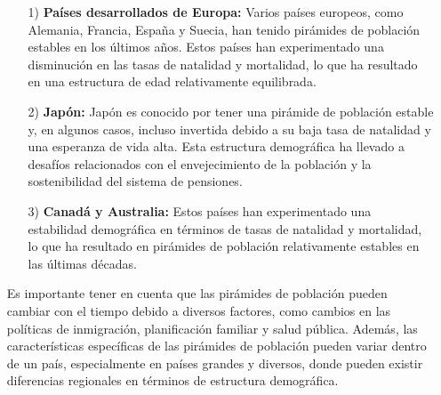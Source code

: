 \documentclass[8pt,a4paper]{beamer}
\begin{document}
{\begin{frame}{}
\begin{block}{}
\justifying
\begin{enumerate}
\justifying
\item[{}]
\begin{enumerate}
\justifying
\item[1)] \textbf{Países desarrollados de Europa:} Varios países europeos, como Alemania, Francia, España y Suecia, han tenido pirámides de población estables en los últimos años. Estos países han experimentado una disminución en las tasas de natalidad y mortalidad, lo que ha resultado en una estructura de edad relativamente equilibrada.

\item[2)] \textbf{Japón:} Japón es conocido por tener una pirámide de población estable y, en algunos casos, incluso invertida debido a su baja tasa de natalidad y una esperanza de vida alta. Esta estructura demográfica ha llevado a desafíos relacionados con el envejecimiento de la población y la sostenibilidad del sistema de pensiones.

\item[3)] \textbf{Canadá y Australia:} Estos países han experimentado una estabilidad demográfica en términos de tasas de natalidad y mortalidad, lo que ha resultado en pirámides de población relativamente estables en las últimas décadas.
\end{enumerate}
Es importante tener en cuenta que las pirámides de población pueden cambiar con el tiempo debido a diversos factores, como cambios en las políticas de inmigración, planificación familiar y salud pública. Además, las características específicas de las pirámides de población pueden variar dentro de un país, especialmente en países grandes y diversos, donde pueden existir diferencias regionales en términos de estructura demográfica.
\end{enumerate}
\end{block}
\end{frame}

}
\end{document}
